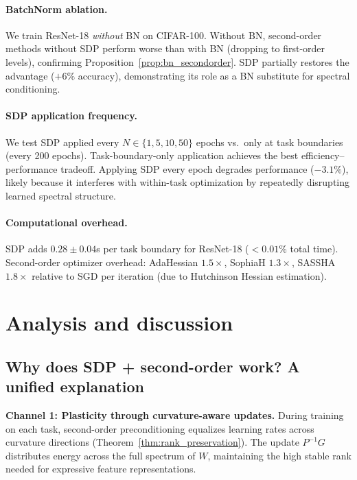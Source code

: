 \documentclass{article}
\begin{document}
\paragraph{BatchNorm ablation.} We train ResNet-18 \emph{without} BN on CIFAR-100. Without BN, second-order methods without SDP perform worse than with BN (dropping to first-order levels), confirming Proposition~\ref{prop:bn_secondorder}. SDP partially restores the advantage ($+6\%$ accuracy), demonstrating its role as a BN substitute for spectral conditioning.

\paragraph{SDP application frequency.} We test SDP applied every $N \in \{1, 5, 10, 50\}$ epochs vs.\ only at task boundaries (every 200 epochs). Task-boundary-only application achieves the best efficiency--performance tradeoff. Applying SDP every epoch degrades performance ($-3.1\%$), likely because it interferes with within-task optimization by repeatedly disrupting learned spectral structure.

\paragraph{Computational overhead.} SDP adds $0.28 \pm 0.04$s per task boundary for ResNet-18 ($<0.01\%$ total time). Second-order optimizer overhead: AdaHessian $1.5\times$, SophiaH $1.3\times$, SASSHA $1.8\times$ relative to SGD per iteration (due to Hutchinson Hessian estimation).

\section{Analysis and discussion}
\label{sec:analysis}

\subsection{Why does SDP + second-order work? A unified explanation}

\textbf{Channel 1: Plasticity through curvature-aware updates.} During training on each task, second-order preconditioning equalizes learning rates across curvature directions (Theorem~\ref{thm:rank_preservation}). The update $P^{-1}G$ distributes energy across the full spectrum of $W$, maintaining the high stable rank needed for expressive feature representations.
\end{document}
